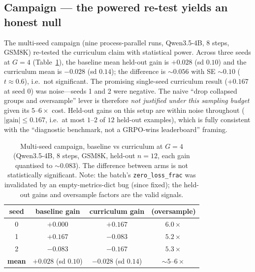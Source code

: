 \documentclass[11pt,a4paper]{article}
\begin{document}
\subsection{Campaign --- the powered re-test yields an honest null}

The multi-seed campaign (nine process-parallel runs, Qwen3.5-4B, 8 steps, GSM8K)
re-tested the curriculum claim with statistical power. Across three seeds at
$G{=}4$ (Table~\ref{tab:campaign}), the baseline mean held-out gain is
$+0.028$ (sd $0.10$) and the curriculum mean is $-0.028$ (sd $0.14$); the
difference is ${\sim}0.056$ with SE ${\sim}0.10$ ($t\approx0.6$), i.e.\ not
significant. The promising single-seed curriculum result ($+0.167$ at seed 0) was
noise---seeds 1 and 2 were negative. The naive ``drop collapsed groups and
oversample'' lever is therefore \emph{not justified under this sampling budget} given its $5$--$6\times$ cost. Held-out
gains on this setup are within noise throughout ($|\text{gain}|\le0.167$, i.e.\ at
most $1$--$2$ of $12$ held-out examples), which is fully consistent with the
``diagnostic benchmark, not a GRPO-wins leaderboard'' framing.

\begin{table}[t]
\centering
\small
\begin{tabular}{@{}cccc@{}}
\toprule
seed & baseline gain & curriculum gain & (oversample) \\
\midrule
0 & $+0.000$ & $+0.167$ & $6.0\times$ \\
1 & $+0.167$ & $-0.083$ & $5.2\times$ \\
2 & $-0.083$ & $-0.167$ & $5.3\times$ \\
\midrule
\textbf{mean} & $\mathbf{+0.028}$ (sd $0.10$) & $\mathbf{-0.028}$ (sd $0.14$) & ${\sim}5$--$6\times$ \\
\bottomrule
\end{tabular}
\caption{Multi-seed campaign, baseline vs curriculum at $G{=}4$ (Qwen3.5-4B,
8 steps, GSM8K, held-out $n=12$, each gain quantised to ${\sim}0.083$). The
difference between arms is not statistically significant. Note: the batch's
\texttt{zero\_loss\_frac} was invalidated by an empty-metrics-dict bug (since
fixed); the held-out gains and oversample factors are the valid signals.}
\label{tab:campaign}
\end{table}
\end{document}
